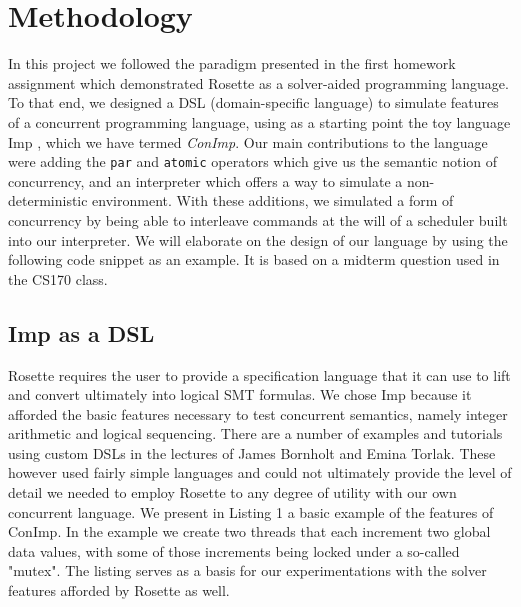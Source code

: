 \section{Methodology}
In this project we followed the paradigm presented in the first homework assignment which demonstrated Rosette as a solver-aided programming language.  To that end, we designed a DSL (domain-specific language) to simulate features of a concurrent programming language, using as a starting point the toy language Imp \cite{winskel1993}, which we have termed {\em ConImp}. Our main contributions to the language were adding the \texttt{par} and \texttt{atomic} operators which give us the semantic notion of concurrency, and an interpreter which offers a way to simulate a non-deterministic environment.  With these additions, we simulated a form of concurrency by being able to interleave commands at the will of a scheduler built into our interpreter.  We will elaborate on the design of our language by using the following code snippet as an example.  It is based on a midterm question used in the CS170 class.

\subsection{Imp as a DSL}
Rosette requires the user to provide a specification language that it can use to lift and convert ultimately into logical SMT formulas.  We chose Imp because it afforded the basic features necessary to test concurrent semantics, namely integer arithmetic and logical sequencing.  There are a number of examples and tutorials using custom DSLs  in the lectures of James Bornholt and Emina Torlak.  These however used fairly simple languages and could not ultimately provide the level of detail we needed to employ Rosette to any degree of utility with our own concurrent language.  We present in Listing 1 a basic example of the features of ConImp.  In the example we create two threads that each increment two global data values, with some of those increments being locked under a so-called "mutex".  The listing serves as a basis for our experimentations with the solver features afforded by Rosette as well.

